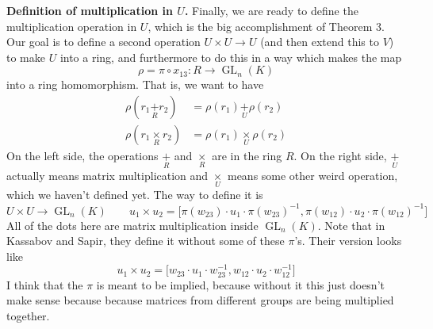 \documentclass[12pt]{article}
\theoremstyle{definition}
\newcommand{\lp}{\left(}
\newcommand{\rp}{\right)}
\newcommand{\tbf}{\textbf}
\newcommand{\noi}{\noindent}
\newcommand{\inv}{^{-1}}
\DeclareMathOperator{\GL}{GL}
\begin{document}
\noi \tbf{Definition of multiplication in $U$.} Finally, we are ready to define the multiplication operation in $U$, which is the big accomplishment of Theorem 3. Our goal is to define a second operation $U \times U \to U$ (and then extend this to $V$) to make $U$ into a ring, and furthermore to do this in a way which makes the map
\[
	\rho = \pi \circ x_{13}:R \to \GL_n(K)
\]
into a ring homomorphism. That is, we want to have
\begin{align*}
	\rho \lp  r_1 \underset{R}{+} r_2 \rp &= \rho(r_1) \underset{U}{+} \rho(r_2) \\
	 \rho \lp r_1 \underset{R}{\times} r_2 \rp &= \rho(r_1) \underset{U}{\times} \rho(r_2)
\end{align*}
On the left side, the operations $\underset{R}{+}$ and $\underset{R}{\times}$ are in the ring $R$. On the right side, $\underset{U}{+}$ actually means matrix multiplication and $\underset{U}{\times}$ means some other weird operation, which we haven't defined yet. The way to define it is
\[
	U \times U \to \GL_n(K) \qquad u_1 \times u_2 = \Big[ \pi(w_{23}) \cdot u_1 \cdot \pi(w_{23}) \inv, \pi(w_{12}) \cdot u_2 \cdot \pi(w_{12}) \inv \Big]
\]
All of the dots here are matrix multiplication inside $\GL_n(K)$. Note that in Kassabov and Sapir, they define it without some of these $\pi$'s. Their version looks like
\[
	u_1 \times u_2 = \Big[ w_{23} \cdot u_1 \cdot w_{23} \inv, w_{12} \cdot u_2 \cdot w_{12} \inv \Big]
\]
I think that the $\pi$ is meant to be implied, because without it this just doesn't make sense because because matrices from different groups are being multiplied together.
\end{document}

